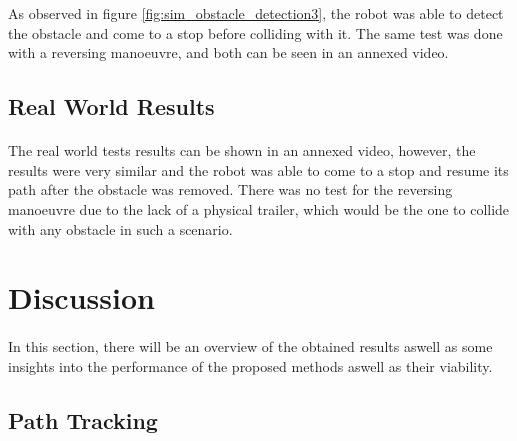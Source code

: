 As observed in figure \ref{fig:sim_obstacle_detection3}, the robot was able to 
detect the obstacle and come to a stop before colliding with it. The same test was 
done with a reversing manoeuvre, and both can be seen in an annexed video.
\subsection{Real World Results}
\paragraph{} The real world tests results can be shown in an annexed video, however, 
the results were very similar and the robot was able to come to a stop and resume its 
path after the obstacle was removed. There was no test for the reversing manoeuvre due to the 
lack of a physical trailer, which would be the one to collide with any obstacle in such a scenario.
\section{Discussion}
\label{sec:discussion}

\paragraph{}In this section, there will be an overview of the obtained results aswell 
as some insights into the performance of the proposed methods aswell as their viability.

\subsection{Path Tracking}
